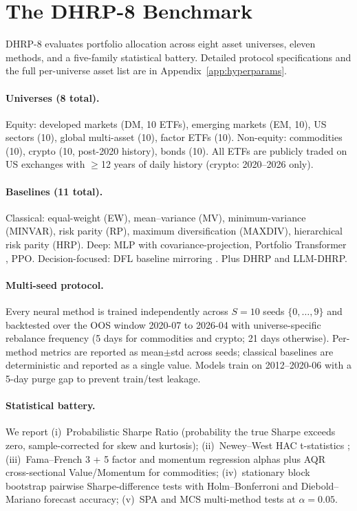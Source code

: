 \section{The DHRP-8 Benchmark}
\label{sec:benchmark}

DHRP-8 evaluates portfolio allocation across eight asset universes,
eleven methods, and a five-family statistical battery. Detailed protocol
specifications and the full per-universe asset list are in
Appendix~\ref{app:hyperparams}.

\paragraph{Universes (8 total).}
Equity: developed markets (DM, 10 ETFs), emerging markets (EM, 10), US
sectors (10), global multi-asset (10), factor ETFs (10).
Non-equity: commodities (10), crypto (10, post-2020 history), bonds
(10). All ETFs are publicly traded on US exchanges with $\geq$12 years
of daily history (crypto: 2020--2026 only).

\paragraph{Baselines (11 total).}
Classical: equal-weight (EW), mean--variance (MV), minimum-variance
(MINVAR), risk parity (RP), maximum diversification (MAXDIV),
hierarchical risk parity (HRP). Deep: MLP with covariance-projection,
Portfolio Transformer \citep{KisielGorse2022}, PPO. Decision-focused:
DFL baseline mirroring \citet{KimLee2025DFL}. Plus DHRP and LLM-DHRP.

\paragraph{Multi-seed protocol.}
Every neural method is trained independently across $S = 10$ seeds
$\{0, \ldots, 9\}$ and backtested over the OOS window 2020-07 to
2026-04 with universe-specific rebalance frequency (5 days for
commodities and crypto; 21 days otherwise). Per-method metrics are
reported as mean$\pm$std across seeds; classical baselines are
deterministic and reported as a single value. Models train on
2012--2020-06 with a 5-day purge gap to prevent train/test leakage.

\paragraph{Statistical battery.}
We report (i)~Probabilistic Sharpe Ratio \citep{Bailey2012PSR}
(probability the true Sharpe exceeds zero, sample-corrected for skew
and kurtosis); (ii)~Newey--West HAC t-statistics
\citep{NeweyWest1987}; (iii)~Fama--French 3 + 5 factor
\citep{FamaFrench2015} and momentum \citep{Carhart1997} regression
alphas plus AQR cross-sectional Value/Momentum
\citep{AsnessMoskowitzPedersen2013} for commodities; (iv)~stationary
block bootstrap \citep{PolitisRomano1994} pairwise Sharpe-difference
tests with Holm--Bonferroni \citep{Holm1979} and Diebold--Mariano
\citep{DieboldMariano1995} forecast accuracy; (v)~SPA \citep{Hansen2005}
and MCS \citep{HansenLundeNason2011} multi-method tests at
$\alpha = 0.05$.

